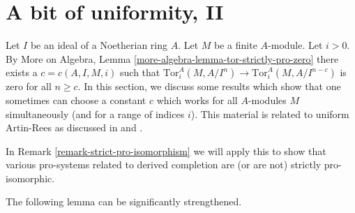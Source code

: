 \section{A bit of uniformity, II}
\label{section-uniform-vanishing-bis}

\noindent
Let $I$ be an ideal of a Noetherian ring $A$. Let $M$ be a finite
$A$-module. Let $i > 0$. By More on Algebra, Lemma
\ref{more-algebra-lemma-tor-strictly-pro-zero}
there exists a $c = c(A, I, M, i)$ such that
$\text{Tor}^A_i(M, A/I^n) \to \text{Tor}^A_i(M, A/I^{n - c})$
is zero for all $n \geq c$. In this section, we discuss
some results which show that one sometimes can choose
a constant $c$ which works for all $A$-modules $M$ simultaneously
(and for a range of indices $i$).
This material is related to uniform Artin-Rees as discussed in
\cite{Huneke-uniform} and \cite{AHS}.

\medskip\noindent
In Remark \ref{remark-strict-pro-isomorphism} we will apply this to show that
various pro-systems related to derived completion are (or are not)
strictly pro-isomorphic.

\medskip\noindent
The following lemma can be significantly strengthened.

